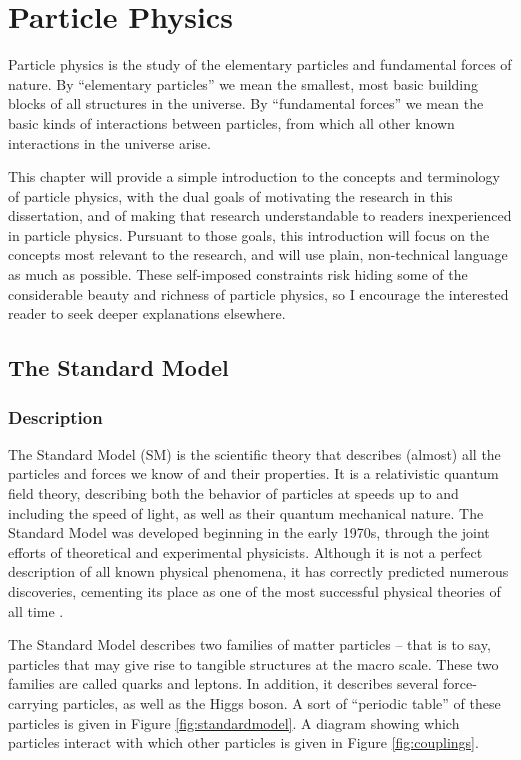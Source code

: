 \chapter{Particle Physics}
\label{chap:particlephysics}

Particle physics is the study of the elementary particles and fundamental forces
of nature. By ``elementary particles'' we mean the smallest, most
basic building blocks of all structures in the universe. By
``fundamental forces'' we mean the basic kinds of interactions between
particles, from which all other known interactions in the universe
arise.

This chapter will provide a simple introduction to the concepts
and terminology of particle physics, with the dual goals of motivating the
research in this dissertation, and of making that research understandable to
readers inexperienced in particle physics. Pursuant to those
goals, this introduction will focus on the concepts most relevant to
the research, and will use plain, non-technical language as much as
possible. These self-imposed constraints risk hiding some of the
considerable beauty and richness of particle physics, so I encourage the
interested reader to seek deeper explanations elsewhere.

\section{The Standard Model}
\label{sec:standardmodel}

\subsection{Description}
\label{ssec:SM:description}

The Standard Model (SM) is the scientific theory that describes
(almost) all the particles and forces we know of and their properties.
It is a relativistic quantum field theory, describing both the
behavior of particles at speeds up to and including the speed of
light, as well as their quantum mechanical nature.
The Standard Model was developed beginning in the early 1970s,
through the joint efforts of theoretical and experimental physicists.
Although it is not a perfect description of all known physical
phenomena, it has correctly predicted numerous discoveries,
cementing its place as one of the most
successful physical theories of all time \cite{griffiths,smcoffee}.

The Standard Model describes two families of matter particles -- that is
to say, particles that may give rise to tangible structures at the macro scale.
These two families are called quarks and leptons. In addition, it
describes several force-carrying particles, as well as the Higgs
boson. A sort of ``periodic table'' of these particles is given in
Figure \ref{fig:standardmodel}. A diagram showing which particles
interact with which other particles is given in Figure \ref{fig:couplings}.

